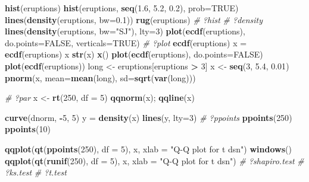 \documentclass[10pt,]{krantz}
\makeatletter
\newenvironment{Shaded}{\begin{snugshade}}{\end{snugshade}}
\newcommand{\KeywordTok}[1]{\textcolor[rgb]{0.13,0.29,0.53}{\textbf{#1}}}
\newcommand{\DataTypeTok}[1]{\textcolor[rgb]{0.13,0.29,0.53}{#1}}
\newcommand{\DecValTok}[1]{\textcolor[rgb]{0.00,0.00,0.81}{#1}}
\newcommand{\FloatTok}[1]{\textcolor[rgb]{0.00,0.00,0.81}{#1}}
\newcommand{\StringTok}[1]{\textcolor[rgb]{0.31,0.60,0.02}{#1}}
\newcommand{\CommentTok}[1]{\textcolor[rgb]{0.56,0.35,0.01}{\textit{#1}}}
\newcommand{\OtherTok}[1]{\textcolor[rgb]{0.56,0.35,0.01}{#1}}
\newcommand{\OperatorTok}[1]{\textcolor[rgb]{0.81,0.36,0.00}{\textbf{#1}}}
\newcommand{\NormalTok}[1]{#1}
\newenvironment{kframe}{%
\medskip{}
\setlength{\fboxsep}{.8em}
 \def\at@end@of@kframe{}%
 \ifinner\ifhmode%
  \def\at@end@of@kframe{\end{minipage}}%
  \begin{minipage}{\columnwidth}%
 \fi\fi%
 \def\FrameCommand##1{\hskip\@totalleftmargin \hskip-\fboxsep
 \colorbox{shadecolor}{##1}\hskip-\fboxsep
     \hskip-\linewidth \hskip-\@totalleftmargin \hskip\columnwidth}%
 \MakeFramed {\advance\hsize-\width
   \@totalleftmargin\z@ \linewidth\hsize
   \@setminipage}}%
 {\par\unskip\endMakeFramed%
 \at@end@of@kframe}
\renewenvironment{Shaded}{\begin{kframe}}{\end{kframe}}
\makeatother
\begin{document}
\begin{Shaded}
\begin{Highlighting}[]
\KeywordTok{hist}\NormalTok{(eruptions)}
\KeywordTok{hist}\NormalTok{(eruptions, }\KeywordTok{seq}\NormalTok{(}\FloatTok{1.6}\NormalTok{, }\FloatTok{5.2}\NormalTok{, }\FloatTok{0.2}\NormalTok{), }\DataTypeTok{prob=}\OtherTok{TRUE}\NormalTok{)}
\KeywordTok{lines}\NormalTok{(}\KeywordTok{density}\NormalTok{(eruptions, }\DataTypeTok{bw=}\FloatTok{0.1}\NormalTok{))}
\KeywordTok{rug}\NormalTok{(eruptions)}
\CommentTok{# ?hist}
\CommentTok{# ?density}
\KeywordTok{lines}\NormalTok{(}\KeywordTok{density}\NormalTok{(eruptions, }\DataTypeTok{bw=}\StringTok{"SJ"}\NormalTok{), }\DataTypeTok{lty=}\DecValTok{3}\NormalTok{)}
\KeywordTok{plot}\NormalTok{(}\KeywordTok{ecdf}\NormalTok{(eruptions), }\DataTypeTok{do.points=}\OtherTok{FALSE}\NormalTok{, }\DataTypeTok{verticals=}\OtherTok{TRUE}\NormalTok{)}
\CommentTok{# ?plot}
\KeywordTok{ecdf}\NormalTok{(eruptions)}
\NormalTok{x =}\StringTok{ }\KeywordTok{ecdf}\NormalTok{(eruptions)}
\NormalTok{x}
\KeywordTok{str}\NormalTok{(x)}
\KeywordTok{x}\NormalTok{()}
\KeywordTok{plot}\NormalTok{(}\KeywordTok{ecdf}\NormalTok{(eruptions), }\DataTypeTok{do.points=}\OtherTok{FALSE}\NormalTok{)}
\KeywordTok{plot}\NormalTok{(}\KeywordTok{ecdf}\NormalTok{(eruptions))}
\NormalTok{long <-}\StringTok{ }\NormalTok{eruptions[eruptions }\OperatorTok{>}\StringTok{ }\DecValTok{3}\NormalTok{]}
\NormalTok{x <-}\StringTok{ }\KeywordTok{seq}\NormalTok{(}\DecValTok{3}\NormalTok{, }\FloatTok{5.4}\NormalTok{, }\FloatTok{0.01}\NormalTok{)}
\KeywordTok{pnorm}\NormalTok{(x, }\DataTypeTok{mean=}\KeywordTok{mean}\NormalTok{(long), }\DataTypeTok{sd=}\KeywordTok{sqrt}\NormalTok{(}\KeywordTok{var}\NormalTok{(long)))}

\CommentTok{# ?par}
\NormalTok{x <-}\StringTok{ }\KeywordTok{rt}\NormalTok{(}\DecValTok{250}\NormalTok{, }\DataTypeTok{df =} \DecValTok{5}\NormalTok{)}
\KeywordTok{qqnorm}\NormalTok{(x); }\KeywordTok{qqline}\NormalTok{(x)}

\KeywordTok{curve}\NormalTok{(dnorm, }\OperatorTok{-}\DecValTok{5}\NormalTok{, }\DecValTok{5}\NormalTok{)}
\NormalTok{y =}\StringTok{ }\KeywordTok{density}\NormalTok{(x)}
\KeywordTok{lines}\NormalTok{(y, }\DataTypeTok{lty=}\DecValTok{3}\NormalTok{)}
\CommentTok{# ?ppoints}
\KeywordTok{ppoints}\NormalTok{(}\DecValTok{250}\NormalTok{)}
\KeywordTok{ppoints}\NormalTok{(}\DecValTok{10}\NormalTok{)}

\KeywordTok{qqplot}\NormalTok{(}\KeywordTok{qt}\NormalTok{(}\KeywordTok{ppoints}\NormalTok{(}\DecValTok{250}\NormalTok{), }\DataTypeTok{df =} \DecValTok{5}\NormalTok{), x, }\DataTypeTok{xlab =} \StringTok{"Q-Q plot for t dsn"}\NormalTok{)}
\KeywordTok{windows}\NormalTok{()}
\KeywordTok{qqplot}\NormalTok{(}\KeywordTok{qt}\NormalTok{(}\KeywordTok{runif}\NormalTok{(}\DecValTok{250}\NormalTok{), }\DataTypeTok{df =} \DecValTok{5}\NormalTok{), x, }\DataTypeTok{xlab =} \StringTok{"Q-Q plot for t dsn"}\NormalTok{)}
\CommentTok{# ?shapiro.test}
\CommentTok{# ?ks.test}
\CommentTok{# ?t.test}



\end{Highlighting}
\end{Shaded}
\end{document}
